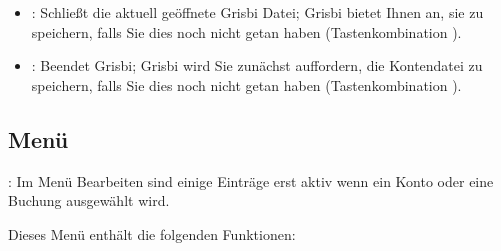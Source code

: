 \begin{itemize}
	\item {}: Schließt die aktuell geöffnete Grisbi Datei; Grisbi bietet Ihnen an, sie zu speichern, falls Sie dies noch nicht getan haben (Tastenkombination ). %
	\item {}: Beendet Grisbi; Grisbi wird Sie zunächst auffordern, die Kontendatei zu speichern, falls Sie dies noch nicht getan haben (Tastenkombination ).%
\end{itemize}


\subsection{Menü \label{home-menus-edit}}

\Note{}: Im Menü Bearbeiten sind einige Einträge erst aktiv wenn ein Konto oder eine Buchung ausgewählt wird.

\vspace{2mm}
Dieses Menü enthält die folgenden Funktionen:%

